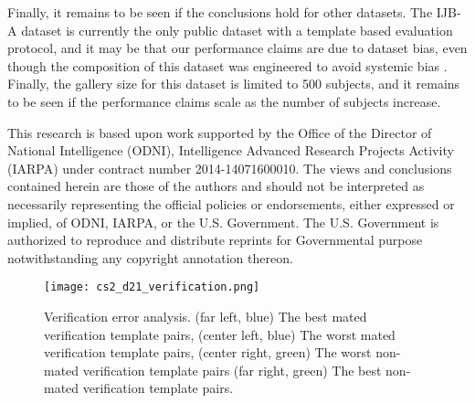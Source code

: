 \documentclass[10pt,twocolumn,letterpaper]{article}
\theoremstyle{definition}		\newtheorem{defn}[thm]{Definition}
\newcommand{\figwidth}{6.85in}
\newcommand{\ARXIV}{}
\begin{document}
 \fi




Finally, it remains to be seen if the conclusions hold for other datasets.  The IJB-A dataset is currently the only public dataset with a template based evaluation protocol, and it may be that our performance claims are due to dataset bias, even though the composition of this dataset was engineered to avoid systemic bias \cite{Klare15}.  Finally, the gallery size for this dataset is limited to 500 subjects, and it remains to be seen if the performance claims scale as the number of subjects increase.  





\smallskip 
{}
This research is based upon work supported by the Office of the Director of National Intelligence (ODNI), Intelligence Advanced Research Projects Activity (IARPA) under contract number 2014-14071600010. The views and conclusions contained herein are those of the authors and should not be interpreted as necessarily representing the official policies or endorsements, either expressed or implied, of ODNI, IARPA, or the U.S. Government.  The U.S. Government is authorized to reproduce and distribute reprints for Governmental purpose notwithstanding any copyright annotation thereon.

\ifdefined\ARXIV
\begin{figure*}[t]
\begin{centering}
\texttt{[image: cs2\_d21\_verification.png]} 
\caption{Verification error analysis.  (far left, blue) The best mated verification template pairs, (center left, blue) The worst mated verification template pairs, (center right, green) The worst non-mated verification template pairs (far right, green) The best non-mated verification template pairs.  
}
\label{f:verification_errors}
\end{centering}
\end{figure*}

 \fi



 
{\small


}
\end{document}
